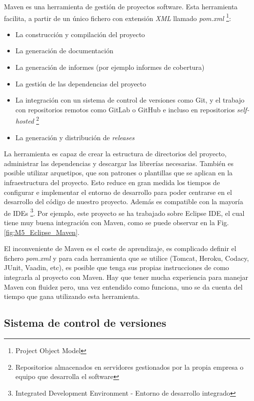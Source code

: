 Maven es una herramienta de gestión de proyectos software. Esta herramienta facilita, a partir de un único fichero con extensión \textit{XML} llamado \textit{pom.xml} \footnote{Project Object Model}:
\begin{itemize}
	\tightlist
	\item La construcción y compilación del proyecto
	\item La generación de documentación
	\item La generación de informes (por ejemplo informes de cobertura)
	\item La gestión de las dependencias del proyecto
	\item La integración con un sistema de control de versiones como Git, y el trabajo con repositorios remotos como GitLab o GitHub e incluso en repositorios \textit{self-hosted} \footnote{Repositorios almacenados en servidores gestionados por la propia empresa o equipo que desarrolla el software}
	\item La generación y distribución de \textit{releases}
\end{itemize}
La herramienta es capaz de crear la estructura de directorios del proyecto, administrar las dependencias y descargar las librerías necesarias. También es posible utilizar arquetipos, que son patrones o plantillas que se aplican en la infraestructura del proyecto. Esto reduce en gran medida los tiempos de configurar e implementar el entorno de desarrollo para poder centrarse en el desarrollo del código de nuestro proyecto. Además es compatible con la mayoría de IDEs \footnote{Integrated Development Environment - Entorno de desarrollo integrado}. Por ejemplo, este proyecto se ha trabajado sobre Eclipse IDE, el cual tiene muy buena integración con Maven, como se puede observar en la Fig. \ref{fig:M5_Eclipse_Maven}.


El inconveniente de Maven es el coste de aprendizaje, es complicado definir el fichero \textit{pom.xml} y para cada herramienta que se utilice (Tomcat, Heroku, Codacy, JUnit, Vaadin, etc), es posible que tenga sus propias instrucciones de como integrarla al proyecto con Maven. Hay que tener mucha experiencia para manejar Maven con fluidez pero, una vez entendido como funciona, uno se da cuenta del tiempo que gana utilizando esta herramienta.

\subsection{Sistema de control de versiones}

